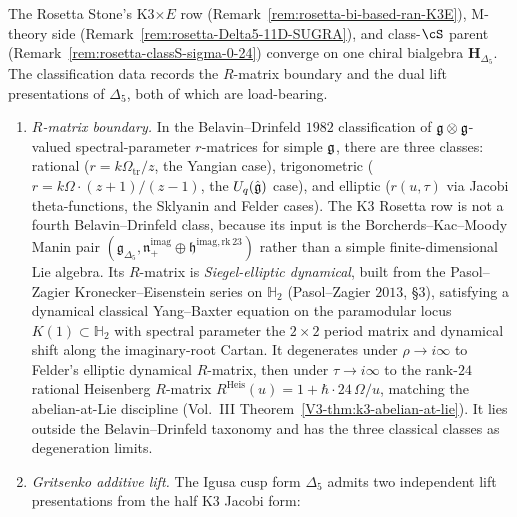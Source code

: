 \begin{remark}
\label{rem:drinfeld-classification-rosetta-R-sieg}%
%
%
%
The Rosetta Stone's K3$\times E$ row
(Remark~\ref{rem:rosetta-bi-based-ran-K3E}),
M-theory side (Remark~\ref{rem:rosetta-Delta5-11D-SUGRA}), and
class-$\cS$ parent (Remark~\ref{rem:rosetta-classS-sigma-0-24})
converge on one chiral bialgebra $\mathbf{H}_{\Delta_5}$. The
classification data records the $R$-matrix boundary and the dual lift
presentations of $\Delta_5$, both of which are load-bearing.
\begin{enumerate}[label=\textup{(D\arabic*)}]
\item \emph{$R$-matrix boundary.} In the Belavin--Drinfeld $1982$
 classification of $\mathfrak{g}\otimes\mathfrak{g}$-valued spectral-parameter $r$-matrices
 for simple $\mathfrak{g}$, there are three classes: rational ($r = k\Omega_{\mathrm{tr}}/z$,
 the Yangian case), trigonometric
 ($r = k\Omega\cdot (z+1)/(z-1)$, the $U_q(\hat{\mathfrak{g}})$ case), and
 elliptic ($r(u,\tau)$ via Jacobi theta-functions, the Sklyanin and
 Felder cases). The K3 Rosetta row is not a fourth
 Belavin--Drinfeld class, because its input is the
 Borcherds--Kac--Moody Manin pair
 $(\mathfrak g_{\Delta_5},\mathfrak n_+^{\mathrm{imag}}
 \oplus\mathfrak h^{\mathrm{imag,rk\,23}})$ rather than a simple
 finite-dimensional Lie algebra. Its $R$-matrix is
 \emph{Siegel-elliptic dynamical}, built from the Pasol--Zagier
 Kronecker--Eisenstein series on $\mathbb{H}_2$
 \textup{(}Pasol--Zagier $2013$, \S $3$\textup{)}, satisfying a
 dynamical classical Yang--Baxter equation on the paramodular locus
 $K(1)\subset\mathbb{H}_2$ with spectral parameter the
 $2\times 2$ period matrix and dynamical shift along the imaginary-root
 Cartan. It degenerates under $\rho\to i\infty$ to Felder's elliptic
 dynamical $R$-matrix, then under $\tau\to i\infty$ to the rank-$24$
 rational Heisenberg $R$-matrix
 $R^{\mathrm{Heis}}(u) = 1 + \hbar\cdot 24\,\Omega/u$, matching the
 abelian-at-Lie discipline
 \textup{(}Vol.~III Theorem~\ref{V3-thm:k3-abelian-at-lie}\textup{)}.
 It lies outside the Belavin--Drinfeld taxonomy and has the three
 classical classes as degeneration limits.
\item \emph{Gritsenko additive lift.} The Igusa cusp form $\Delta_5$
	 admits two independent lift presentations from the half K3 Jacobi form:

\end{enumerate}
\end{remark}
